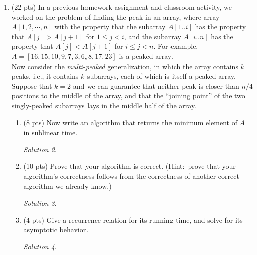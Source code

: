\documentclass[12pt]{article}
\theoremstyle{remark}
\newtheorem*{solution}{Solution}
\begin{document}
\begin{enumerate}
\begin{enumerate}
\begin{solution}
    \end{solution}
    \pagebreak

\item (15 pts) Implement your strategy and the greedy strategy in Python and include code to simulate a game. Your simulation work for up to 100 cards, and values ranging from 1 to 100. Your simulation should include a randomly generated collection of cards and show the sum of cards in each hand at the end of the game. 
\end{enumerate}

\pagebreak
\item (22 pts) 
	In a previous homework assignment and classroom activity, we worked on the problem of finding the peak in an array, where array $A[1, 2, \cdots, n]$ with the property that the subarray $A[1..i]$ has the property that $A[j]>A[j+1]$ for $1\leq j< i$, and the subarray $A[i..n]$ has the property that $A[j]<A[j+1]$ for $i\leq j < n$. For example, $A=[16, 15, 10, 9, 7, 3, 6, 8, 17, 23]$ is a peaked array.\\
	
	Now consider the \textit{multi-peaked} generalization, in which the array contains $k$ peaks, i.e., it contains $k$ subarrays, each of which is itself a peaked array. Suppose that $k=2$ and we can guarantee that neither peak is closer than $n/4$ positions to the middle of the array, and that the ``joining point'' of the two singly-peaked subarrays lays in the middle half of the array. 
	\begin{enumerate}
	    \item (8 pts) Now write an algorithm that returns the minimum element of $A$ in sublinear time.
	    \begin{solution}
    
        \end{solution}
        \pagebreak

	    \item (10 pts) Prove that your algorithm is correct. (Hint:\ prove that your algorithm's correctness follows from the correctness of another correct algorithm we already know.)
	    \begin{solution}
    
        \end{solution}
        \pagebreak

	    \item (4 pts) Give a recurrence relation for its running time, and solve for its asymptotic behavior.
	   \begin{solution}
    

\end{solution}
\end{enumerate}
\end{enumerate}
\end{document}
